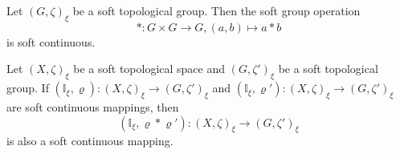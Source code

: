 \documentclass[10pt,a4paper]{amsart}
\begin{document}
\begin{thm}\label{grpoperationcont}Let $(G,\zeta)_\xi$ be a soft topological group. Then the soft group operation
\[\ast\colon G\times G\to G, (a,b)\mapsto a\ast b\]
is soft continuous.
\end{thm}

\begin{prop}\label{productcont}    Let $(X,\zeta)_\xi$ be a soft topological space and $(G,\zeta')_\xi$ be a  soft topological  group. If
\((\mathbb{I}_\xi , \varrho)\colon (X,\zeta)_\xi\to (G,\zeta')_\xi \) and
\((\mathbb{I}_\xi , \varrho')\colon (X,\zeta)_\xi\to (G,\zeta')_\xi\) are soft continuous mappings, then
\[(\mathbb{I}_\xi , \varrho\ast \varrho')\colon (X,\zeta)_\xi\to (G,\zeta')_\xi \] is also a soft continuous mapping.
\end{prop}
\end{document}
